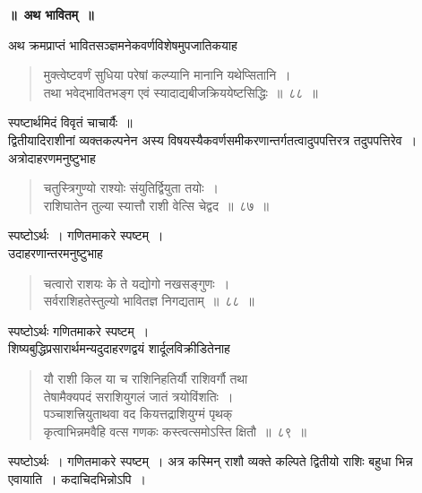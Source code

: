 \documentclass[11pt, openany]{book}
\begin{document}
 \label{bhavita}
\begin{center}
    \textbf{\LARGE ॥~अथ भावितम्~॥~}
\end{center}

\vspace{2mm}
 अथ क्रमप्राप्तं भावितसञ्ज्ञमनेकवर्णविशेषमुपजातिकयाह\textendash
 \begin{quote}
     \bs
      मुक्त्वेष्टवर्णं सुधिया परेषां कल्प्यानि मानानि यथेप्सितानि~। \\
 तथा भवेद्भावितभङ्ग एवं स्यादाद्यबीजक्रिययेष्टसिद्धिः~॥~८८~॥~
\end{quote}

स्पष्टार्थमिदं विवृतं चाचार्यैः~॥ \\

\vspace{-3mm}
 द्वितीयादिराशीनां व्यक्तकल्पनेन अस्य विषयस्यैकवर्णसमीकरणान्तर्गतत्वादुपपत्तिरत्र तदुपपत्तिरेव~। अत्रोदाहरणमनुष्टुभाह\textendash
\begin{quote}
    \ex
     चतुस्त्रिगुण्यो राश्योः संयुतिर्द्वियुता तयोः~। \\
 राशिघातेन तुल्या स्यात्तौ राशी वेत्सि चेद्वद~॥~८७~॥~

\end{quote}

स्पष्टोऽर्थः~। गणितमाकरे स्पष्टम्~। \\

\vspace{-3mm}
 उदाहरणान्तरमनुष्टुभाह\textendash 
\begin{quote}
    \ex
     चत्वारो राशयः के ते यद्योगो नखसङ्गुणः~। \\
 सर्वराशिहतेस्तुल्यो भावितज्ञ निगद्यताम्~॥~८८~॥~
\end{quote}

स्पष्टोऽर्थः गणितमाकरे स्पष्टम्~। \\

\vspace{-3mm}
 शिष्यबुद्धिप्रसारार्थमन्यदुदाहरणद्वयं शार्दूलविक्रीडितेनाह\textendash 
\begin{quote}
    \ex
     यौ राशी किल या च राशिनिहतिर्यौ राशिवर्गौ तथा \\
 तेषामैक्यपदं सराशियुगलं जातं त्रयोविंशतिः~। \\
 पञ्चाशत्त्रियुताथवा वद कियत्तद्राशियुग्मं पृथक् \\
 कृत्वाभिन्नमवैहि वत्स गणकः कस्त्वत्समोऽस्ति क्षितौ~॥~८९~॥~
\end{quote}

स्पष्टोऽर्थः~। गणितमाकरे स्पष्टम्~। अत्र कस्मिन् राशौ व्यक्ते कल्पिते 
द्वितीयो राशिः बहुधा भिन्न एवायाति~। कदाचिदभिन्नोऽपि~।
\end{document}
